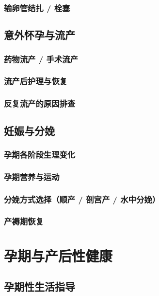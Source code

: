 \begin{enumerate}
\subsection{输卵管结扎 / 栓塞}

\section{意外怀孕与流产}
\subsection{药物流产 / 手术流产}
\subsection{流产后护理与恢复}
\subsection{反复流产的原因排查}

\section{妊娠与分娩}
\subsection{孕期各阶段生理变化}
\subsection{孕期营养与运动}
\subsection{分娩方式选择（顺产 / 剖宫产 / 水中分娩）}
\subsection{产褥期恢复}

\chapter{孕期与产后性健康}

\section{孕期性生活指导}

\end{enumerate}

